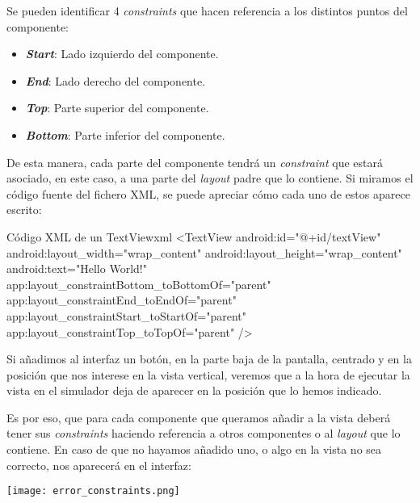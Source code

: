 Se pueden identificar 4 \textit{constraints} que hacen referencia a los distintos puntos del componente:
\begin{itemize}
    \item \textit{\textbf{Start}}: Lado izquierdo del componente.
    \item \textit{\textbf{End}}: Lado derecho del componente.
    \item \textit{\textbf{Top}}: Parte superior del componente.
    \item \textit{\textbf{Bottom}}: Parte inferior del componente.
\end{itemize}

De esta manera, cada parte del componente tendrá un \textit{constraint} que estará asociado, en este caso, a una parte del \textit{layout} padre que lo contiene. Si miramos el código fuente del fichero XML, se puede apreciar cómo cada uno de estos aparece escrito:

\begin{mycode}{Código XML de un TextView}{xml}{}
<TextView
    android:id="@+id/textView"
    android:layout_width="wrap_content"
    android:layout_height="wrap_content"
    android:text="Hello World!"
    app:layout_constraintBottom_toBottomOf="parent"
    app:layout_constraintEnd_toEndOf="parent"
    app:layout_constraintStart_toStartOf="parent"
    app:layout_constraintTop_toTopOf="parent" />
\end{mycode}

Si añadimos al interfaz un botón, en la parte baja de la pantalla, centrado y en la posición que nos interese en la vista vertical, veremos que a la hora de ejecutar la vista en el simulador deja de aparecer en la posición que lo hemos indicado.


Es por eso, que para cada componente que queramos añadir a la vista deberá tener sus \textit{constraints} haciendo referencia a otros componentes o al \textit{layout} que lo contiene. En caso de que no hayamos añadido uno, o algo en la vista no sea correcto, nos aparecerá en el interfaz:

\begin{center}
    \texttt{[image: error\_constraints.png]}
\end{center}


